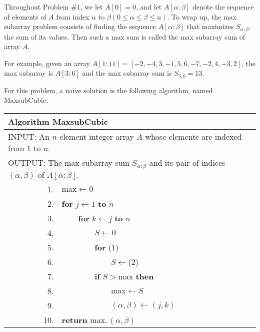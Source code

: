 \documentclass{article}
\begin{document}
Throughout Problem \#1, we let $A[0]=0$, and let $A[\alpha:\beta]$ denote the sequence of elements of $A$
from index $\alpha$ to $\beta(0\leq \alpha\leq\beta\leq n)$. 
To wrap up, the max subarray problem consists of finding the sequence $A[\alpha:\beta]$ that 
maximizes $S_{\alpha:\beta}$, the sum of its values.
Then such a max sum is called the max subarray sum of array $A$.

For example, given an array $A[1:11]=[-2,-4,3,-1,5, 6,-7,-2,4,-3,2]$,
the max subarray is $A[3:6]$ and the max subarray sum is $S_{3,6}=13$. 

For this problem, a naive solution is the following algorithm, named \textsf{MaxsubCubic}:
\begin{table}[h]
\centering
\begin{tabular}{lrlllll}\hline
\multicolumn{7}{l}{\textsf{Algorithm} MaxsubCubic} \\ \hline
\multicolumn{7}{l}{INPUT: An $n$-element integer array $A$ whose elements are indexed from $1$ to $n$.}\\
\multicolumn{7}{l}{OUTPUT: The max subarray sum $S_{\alpha:\beta}$ and its pair of indices $(\alpha,\beta)$ of $A[\alpha:\beta]$.} \\ 
&1. & \multicolumn{5}{l}{$\text{max}\gets 0$}\\
&2. & \multicolumn{5}{l}{\textbf{for} $j\gets 1$ \textbf{to} $n$}\\
&  3. &  & \multicolumn{4}{l}{\textbf{for} $k\gets j$ \textbf{to} $n$}\\
&  4. &  & &\multicolumn{3}{l}{$S\gets 0$}\\
&  5. &  & & \multicolumn{3}{l}{\textbf{for} \underline{\hspace{5cm}}\hfill(1)}\\
&  6. &  & & & \multicolumn{2}{l}{$S\gets $\underline{\hspace{5cm}}\hfill(2)}\\
&  7. &  & & \multicolumn{3}{l}{\textbf{if} $S>\text{max}$ \textbf{then}}\\
&8. & & & &\multicolumn{2}{l}{$\text{max}\gets S$}\\
&9. & & & &\multicolumn{2}{l}{$(\alpha,\beta)\gets (j,k)$}\\
&10. &  \multicolumn{5}{l}{\textbf{return} $\text{max},(\alpha,\beta)$}\\\hline
\end{tabular}
\end{table}
\end{document}
